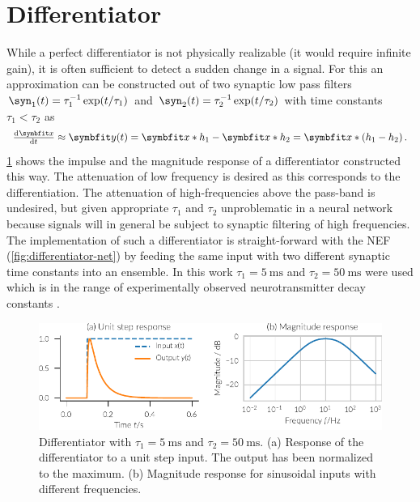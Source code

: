 \section{Differentiator}\label{sec:differentiator}
While a perfect differentiator is not physically realizable (it would require infinite gain), it is often sufficient to detect a sudden change in a signal.
For this an approximation can be constructed out of two synaptic low pass filters $\syn_1(t) =  \tau_1^{-1} \exp(t/\tau_1)$ and $\syn_2(t) = \tau_2^{-1} \exp(t/\tau_2)$ with time constants $\tau_1 < \tau_2$ as
\begin{equation}
    \od{\vc x}{t} \approx \vc y(t) = \vc x * h_1 - \vc x * h_2 = \vc x * \del{h_1 - h_2} \text{.}
\end{equation}
\cref{fig:differentiator} shows the impulse and the magnitude response of a differentiator constructed this way.
The attenuation of low frequency is desired as this corresponds to the differentiation.
The attenuation of high-frequencies above the pass-band is undesired, but given appropriate $\tau_1$ and $\tau_2$ unproblematic in a neural network because signals will in general be subject to synaptic filtering of high frequencies.
The implementation of such a differentiator is straight-forward with the NEF (\cref{fig:differentiator-net}) by feeding the same input with two different synaptic time constants into an ensemble.
In this work $\tau_1 = \SI{5}{\milli\second}$ and $\tau_2 = \SI{50}{\milli\second}$ were used which is in the range of experimentally observed neurotransmitter decay constants \parencite{sah1990-1,moreno-bote2005}.
\begin{figure}
    \centering
    \includegraphics{figures/differentiator}
    \caption[Differentiator]{Differentiator with $\tau_1 = \SI{5}{\milli\second}$ and $\tau_2 = \SI{50}{\milli\second}$. (a) Response of the differentiator to a unit step input. The output has been normalized to the maximum. (b) Magnitude response for sinusoidal inputs with different frequencies.}\label{fig:differentiator}
\end{figure}

